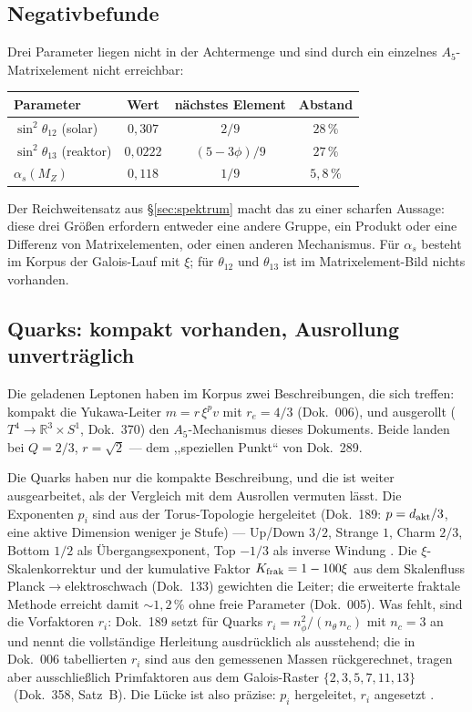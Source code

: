 \subsection{Negativbefunde \XM}

Drei Parameter liegen nicht in der Achtermenge und sind durch ein einzelnes
$A_5$-Matrixelement nicht erreichbar:
\begin{center}
\begin{tabular}{@{}lccc@{}}
\toprule
Parameter & Wert & nächstes Element & Abstand \\
\midrule
$\sin^2\theta_{12}$ (solar) & $0{,}307$ & $2/9$ & $28\,\%$ \\
$\sin^2\theta_{13}$ (reaktor) & $0{,}0222$ & $(5-3\phi)/9$ & $27\,\%$ \\
$\alpha_s(M_Z)$ & $0{,}118$ & $1/9$ & $5{,}8\,\%$ \\
\bottomrule
\end{tabular}
\end{center}
Der Reichweitensatz aus §\ref{sec:spektrum} macht das zu einer scharfen
Aussage: diese drei Größen erfordern entweder eine andere Gruppe, ein
Produkt oder eine Differenz von Matrixelementen, oder einen anderen
Mechanismus. Für $\alpha_s$ besteht im Korpus der Galois-Lauf mit $\xi$;
für $\theta_{12}$ und $\theta_{13}$ ist im Matrixelement-Bild nichts
vorhanden.

\subsection{Quarks: kompakt vorhanden, Ausrollung unverträglich}
\label{sec:quarks}

Die geladenen Leptonen haben im Korpus zwei Beschreibungen, die sich treffen:
kompakt die Yukawa-Leiter $m = r\,\xi^p v$ mit $r_e = 4/3$ (Dok.~006), und
ausgerollt ($T^4\to\mathbb R^3\times S^1$, Dok.~370) den $A_5$-Mechanismus
dieses Dokuments. Beide landen bei $Q = 2/3$, $r = \sqrt2$ --- dem
,,speziellen Punkt`` von Dok.~289.

Die Quarks haben nur die kompakte Beschreibung, und die ist weiter
ausgearbeitet, als der Vergleich mit dem Ausrollen vermuten lässt. Die
Exponenten $p_i$ sind aus der Torus-Topologie hergeleitet (Dok.~189:
$p = d_{\rm akt}/3$, eine aktive Dimension weniger je Stufe) --- Up/Down
$3/2$, Strange $1$, Charm $2/3$, Bottom $1/2$ als Übergangsexponent, Top
$-1/3$ als inverse Windung \KM. Die $\xi$-Skalenkorrektur und der
kumulative Faktor $K_{\rm frak} = 1-100\xi$ aus dem Skalenfluss
Planck$\to$elektroschwach (Dok.~133) gewichten die Leiter; die erweiterte
fraktale Methode erreicht damit $\sim1{,}2\,\%$ ohne freie Parameter
(Dok.~005). Was fehlt, sind die Vorfaktoren $r_i$: Dok.~189 setzt für
Quarks $r_i = n_\phi^2/(n_\theta\,n_c)$ mit $n_c = 3$ an und nennt die
vollständige Herleitung ausdrücklich als ausstehend; die in Dok.~006
tabellierten $r_i$ sind aus den gemessenen Massen rückgerechnet, tragen aber
ausschließlich Primfaktoren aus dem Galois-Raster $\{2,3,5,7,11,13\}$
\BM~(Dok.~358, Satz~B). Die Lücke ist also präzise: $p_i$ hergeleitet, $r_i$
angesetzt \SM.

